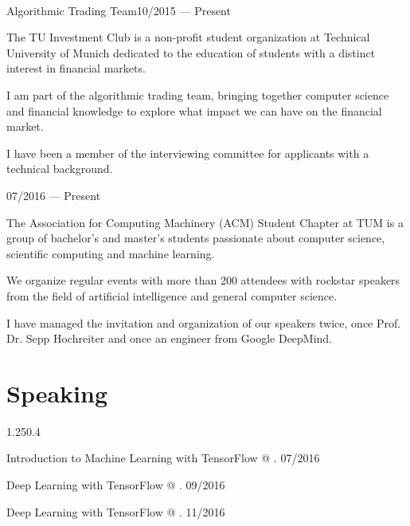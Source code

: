 \begin{entry}{}{\\Algorithmic Trading Team}{10/2015 --- Present}
  \item The TU Investment Club is a non-profit student organization at Technical University of Munich dedicated to the education of students with a distinct interest in financial markets.
  \item I am part of the algorithmic trading team, bringing together computer science and financial knowledge to explore what impact we can have on the financial market.
  \item I have been a member of the interviewing committee for applicants with a technical background.
\end{entry}
\begin{entry}{}{}{07/2016 --- Present}
  \item The Association for Computing Machinery (ACM) Student Chapter at TUM is a group of bachelor's and master's students passionate about computer science, scientific computing and machine learning.
  \item We organize regular events with more than 200 attendees with rockstar speakers from the field of artificial intelligence and general computer science.
  \item I have managed the invitation and organization of our speakers twice, once Prof. Dr. Sepp Hochreiter and once an engineer from Google DeepMind.
\end{entry}

\section{Speaking}{1.25}{0.4}
\begin{simpleentry}
  \item Introduction to Machine Learning with TensorFlow @ . \hspace{3cm} 07/2016
  \item Deep Learning with TensorFlow @ . \hspace{7.65cm} 09/2016
  \item Deep Learning with TensorFlow @ . \hspace{5.03cm} 11/2016
\end{simpleentry}

